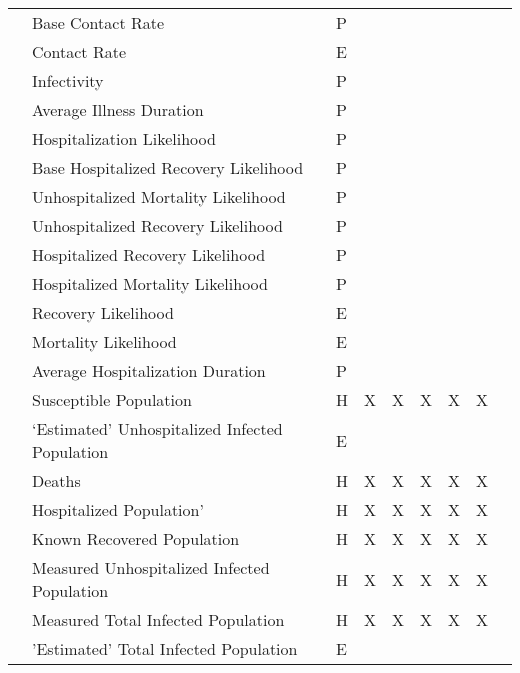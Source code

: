 \begin{center}
\begin{longtable}{|C{1.5cm}|C{2.5cm}|C{0.75cm}|C{1cm}|C{1cm}|C{2cm}|C{1.5cm}|C{1.5cm}|C{1cm}|}
 & Base Contact Rate & P &  & & & & \\*  
& Contact Rate & E & & & & & \\* 
& Infectivity & P & & & & & \\* 
& Average Illness Duration & P & & & & & \\* 
& Hospitalization Likelihood & P & & & & & \\* 
& Base Hospitalized Recovery Likelihood & P & & & & & \\* 
& Unhospitalized Mortality Likelihood & P & & & & & \\* 
& Unhospitalized Recovery Likelihood & P & & & & & \\* 
& Hospitalized Recovery Likelihood & P & & & & & \\* 
& Hospitalized Mortality Likelihood & P & & & & & \\* 
& Recovery Likelihood & E & & & & & \\* 
& Mortality Likelihood & E & & & & & \\* 
& Average Hospitalization Duration & P & & & & & \\ \hline

 & Susceptible Population & H & X & X & X & X & X \\* 
& `Estimated' Unhospitalized Infected Population & E & & & & & \\* 
& Deaths & H & X & X & X & X & X \\ 
& Hospitalized Population' & H & X & X & X & X & X \\* 
& Known Recovered Population & H & X & X & X & X & X \\* 
& Measured Unhospitalized Infected Population & H & X & X & X & X & X \\* 
& Measured Total Infected Population & H & X & X & X & X & X \\* 
& 'Estimated' Total Infected Population & E & & & & & \\ \hline


\end{longtable}
\end{center}
